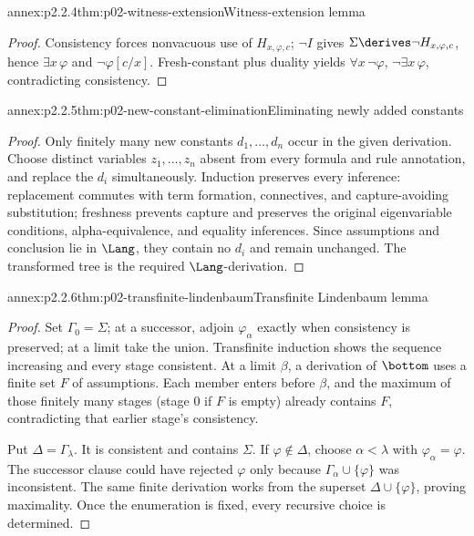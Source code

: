 \begin{annexitem}{annex:p2.2.4}{thm:p02-witness-extension}{Witness-extension lemma}
\begin{proof}
Consistency forces nonvacuous use of \(H_{x,\varphi,c}\); \(\neg I\) gives
\(\Sigma\derives\neg H_{x,\varphi,c}\), hence
\(\exists x\,\varphi\) and \(\neg\varphi[c/x]\).  Fresh-constant plus duality
yields \(\forall x\,\neg\varphi\), \(\neg\exists x\,\varphi\),
contradicting consistency.
\end{proof}
\end{annexitem}

\begin{annexitem}{annex:p2.2.5}{thm:p02-new-constant-elimination}{Eliminating newly added constants}
\begin{proof}
Only finitely many new constants \(d_1,\ldots,d_n\) occur in the given
derivation.  Choose distinct variables \(z_1,\ldots,z_n\) absent from every
formula and rule annotation, and replace the \(d_i\) simultaneously.
Induction preserves every inference: replacement commutes with term formation,
connectives, and capture-avoiding substitution; freshness prevents capture
and preserves the original eigenvariable conditions, alpha-equivalence, and
equality inferences.  Since assumptions and conclusion lie in \(\Lang\), they
contain no \(d_i\) and remain unchanged.  The transformed tree is the
required \(\Lang\)-derivation.
\end{proof}
\end{annexitem}

\begin{annexitem}{annex:p2.2.6}{thm:p02-transfinite-lindenbaum}{Transfinite Lindenbaum lemma}
\begin{proof}
Set \(\Gamma_0=\Sigma\); at a successor, adjoin
\(\varphi_\alpha\) exactly when consistency is preserved; at a limit take
the union.  Transfinite induction shows the sequence increasing and every
stage consistent.  At a limit \(\beta\), a
derivation of \(\bottom\) uses a finite set \(F\) of assumptions.  Each
member enters before \(\beta\), and the maximum of those finitely many
stages (stage \(0\) if \(F\) is empty) already contains \(F\), contradicting
that earlier stage's consistency.

Put \(\Delta=\Gamma_\lambda\).  It is consistent and contains \(\Sigma\).
If \(\varphi\notin\Delta\), choose \(\alpha<\lambda\) with
\(\varphi_\alpha=\varphi\).  The successor clause could have rejected
\(\varphi\) only because \(\Gamma_\alpha\cup\{\varphi\}\) was
inconsistent.  The same finite derivation works from the superset
\(\Delta\cup\{\varphi\}\), proving maximality.  Once the enumeration is
fixed, every recursive choice is determined.
\end{proof}
\end{annexitem}

